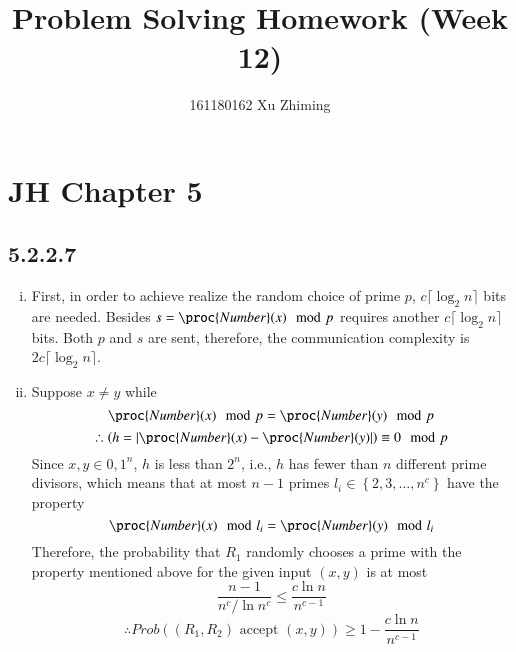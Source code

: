 \documentclass[twocolumn]{article}
\begin{document}
	\title{Problem Solving Homework (Week 12)}\author{161180162 Xu Zhiming}\maketitle
	\section*{JH Chapter 5}
	\subsection*{5.2.2.7}
	\begin{enumerate}[(i)]
		\item First, in order to achieve realize the random choice of prime $p$, $c\lceil\log_2n\rceil$ bits are needed. Besides $s=\proc{Number}(x)\mod p$ requires another $c\lceil\log_2n\rceil$ bits. Both $p$ and $s$ are sent, therefore, the communication complexity is $2c\lceil\log_2n\rceil$.
		\item Suppose $x\neq y$ while $$\proc{Number}(x)\mod p=\proc{Number}(y)\mod p$$
		$$\therefore \left(h=\left|\proc{Number}(x)-\proc{Number}(y)\right|\right)\equiv 0\mod p$$
		Since $x,y\in{0,1}^n$, $h$ is less than $2^n$, i.e., $h$ has fewer than $n$ different prime divisors, which means that at most $n-1$
		primes $l_i\in\left\{2,3,\dots,n^c\right\}$ have the property
		$$\proc{Number}(x)\mod l_i=\proc{Number}(y)\mod l_i$$
		Therefore, the probability that $R_1$ randomly chooses a prime with the property mentioned above for the given input $(x,y)$ is at most
		$$\frac{n-1}{n^c/\ln n^c}\le \frac{c\ln n}{n^{c-1}}$$
		$$\therefore Prob\left(\left(R_1,R_2\right)\text{ accept }(x,y)\right)\ge 1-\frac{c\ln n}{n^{c-1}}$$
 	\end{enumerate}
\end{document}
